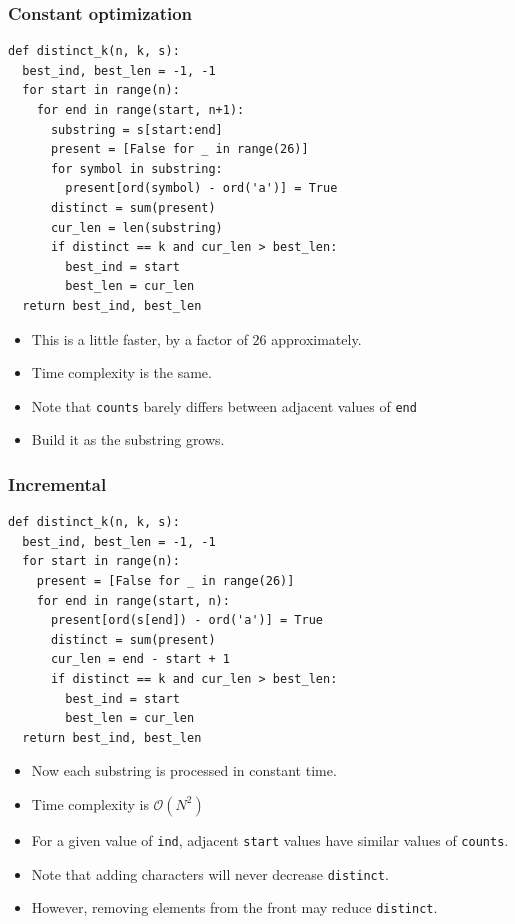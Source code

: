 \documentclass[10pt]{beamer}
\begin{document}
\begin{frame}
    \frametitle{Constant optimization}
	\begin{tiny}
        \begin{verbatim}
def distinct_k(n, k, s):
  best_ind, best_len = -1, -1
  for start in range(n):
    for end in range(start, n+1):
      substring = s[start:end]
      present = [False for _ in range(26)]
      for symbol in substring:
        present[ord(symbol) - ord('a')] = True
      distinct = sum(present)
      cur_len = len(substring)
      if distinct == k and cur_len > best_len:
        best_ind = start
        best_len = cur_len
  return best_ind, best_len
        \end{verbatim}
    \end{tiny}
    \begin{itemize}
        \item<2-> This is a little faster, by a factor of $26$ approximately.
        \item<3-> Time complexity is the same.
        \item<4-> Note that \texttt{counts} barely differs between adjacent values of \texttt{end}
        \item<5-> Build it as the substring grows.
    \end{itemize}
\end{frame}

\begin{frame}
    \frametitle{Incremental}
	\begin{tiny}
        \begin{verbatim}
def distinct_k(n, k, s):
  best_ind, best_len = -1, -1
  for start in range(n):
    present = [False for _ in range(26)]
    for end in range(start, n):
      present[ord(s[end]) - ord('a')] = True
      distinct = sum(present)
      cur_len = end - start + 1
      if distinct == k and cur_len > best_len:
        best_ind = start
        best_len = cur_len
  return best_ind, best_len
        \end{verbatim}
    \end{tiny}
    \begin{itemize}
        \item<2-> Now each substring is processed in constant time.
        \item<3-> Time complexity is $\mathcal{O}(N^2)$
        \item<4-> For a given value of \texttt{ind}, adjacent \texttt{start} values have similar values of \texttt{counts}.
        \item<5-> Note that adding characters will never decrease \texttt{distinct}.
        \item<6-> However, removing elements from the front may reduce \texttt{distinct}.
    \end{itemize}
\end{frame}
\end{document}
